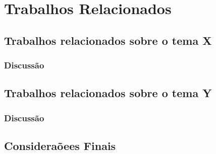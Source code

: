 \chapter{Trabalhos Relacionados}\label{cap:relacionados}


\section{Trabalhos relacionados sobre o tema X}
\subsection{Discussão}

\section{Trabalhos relacionados sobre o tema Y}
\subsection{Discussão}

\section{Consideraõees Finais}